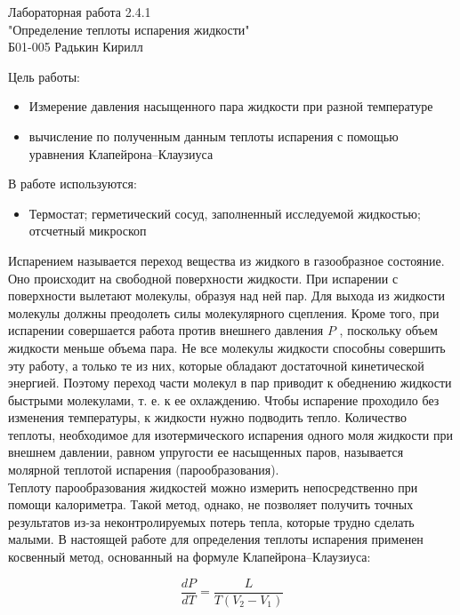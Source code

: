 \documentclass[12pt,a4paper]{article}
\begin{document}
	\begin{center}
		Лабораторная работа 2.4.1 \\
		"Определение теплоты испарения жидкости" \\
		Б01-005 Радькин Кирилл
	\end{center}
	
	Цель работы:
	
	\begin{itemize}
		\item Измерение давления насыщенного пара жидкости при разной температуре
		\item вычисление по полученным данным теплоты испарения с помощью уравнения Клапейрона–Клаузиуса	
	\end{itemize}
	
	В работе используются:
	
	\begin{itemize}
		\item Термостат; герметический сосуд, заполненный исследуемой жидкостью; отсчетный микроскоп
	\end{itemize}
	
	Испарением называется переход вещества из жидкого в газообразное состояние. Оно происходит на свободной поверхности жидкости. При испарении с поверхности вылетают молекулы, образуя над ней пар. Для выхода из жидкости молекулы должны преодолеть силы молекулярного сцепления. Кроме того, при испарении совершается работа против внешнего давления $P$ , поскольку объем жидкости меньше объема пара. Не все молекулы жидкости способны совершить эту работу, а только те из них, которые обладают достаточной кинетической энергией. Поэтому переход части молекул в пар приводит к обеднению жидкости быстрыми молекулами, т. е. к ее охлаждению. Чтобы испарение проходило без изменения температуры, к жидкости нужно подводить тепло. Количество теплоты, необходимое для изотермического испарения одного моля жидкости при внешнем давлении, равном упругости ее насыщенных паров, называется молярной теплотой испарения (парообразования).\\
	
Теплоту парообразования жидкостей можно измерить непосредственно при помощи калориметра. Такой метод, однако, не позволяет получить точных результатов из-за неконтролируемых потерь тепла, которые трудно сделать малыми. В настоящей работе для определения теплоты испарения применен косвенный метод, основанный на формуле Клапейрона–Клаузиуса:

	\begin{equation}
		\dfrac{dP}{dT} = \dfrac{L}{T(V_2 - V_1)}
	\end{equation}
	
\end{document}

